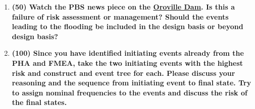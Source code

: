 \documentclass[11pt,a4paper]{article}
\begin{document}
\begin{enumerate}[leftmargin=*,topsep=0pt,font=\bfseries]
        
        
        
        
        
        
        
        
        
        
        
        
        \newpage
    \item\textbf{(50) Watch the PBS news piece on the \href{https://youtu.be/Quh6fX57YxY}{Oroville Dam}. Is this a failure of risk assessment or management? Should the events leading to the flooding be included in the design basis or beyond design basis?}
        \vspace{\baselineskip}


























        \newpage
    \item\textbf{(100) Since you have identified initiating events already from the PHA and FMEA, take the two initiating events with the highest risk and construct and event tree for each. Please discuss your reasoning and the sequence from initiating event to final state.  Try to assign nominal frequencies to the events and discuss the risk of the final states.}
        \vspace{\baselineskip}
        
        
        
        
        
        
        
        
        
        
        
        
        
        
        
        
        
        
        
        
        
        
        
        
        
        
        
        
        

\end{enumerate}
\end{document}
